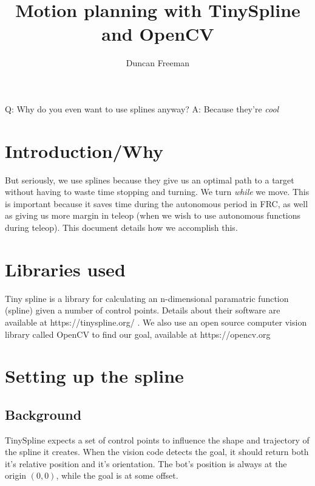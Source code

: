 \documentclass[12pt, english]{article}
\date{}
\title{ Motion planning with TinySpline and OpenCV }
\begin{document}
\author{
	Duncan Freeman
}

\maketitle
\noindent
	\bgroup\obeylines
	Q: Why do you even want to use splines anyway?
	A: Because they're \textit{cool}
	\egroup

\tableofcontents
\newpage

\section{Introduction/Why}
But seriously, we use splines because they give us an optimal path to a target without having to waste time stopping and turning. We turn \textit{while} we move. This is important because it saves time during the autonomous period in FRC, as well as giving us more margin in teleop (when we wish to use autonomous functions during teleop). This document details how we accomplish this.

\section{Libraries used}
Tiny spline is a library for calculating an n-dimensional paramatric function (spline) given a number of control points. Details about their software are available at https://tinyspline.org/ . We also use an open source computer vision library called OpenCV to find our goal, available at https://opencv.org

\section{Setting up the spline}
\subsection{Background}
TinySpline expects a set of control points to influence the shape and trajectory of the spline it creates. When the vision code detects the goal, it should return both it's relative position and it's orientation. The bot's position is always at the origin $(0,0)$, while the goal is at some offset.
\end{document}
